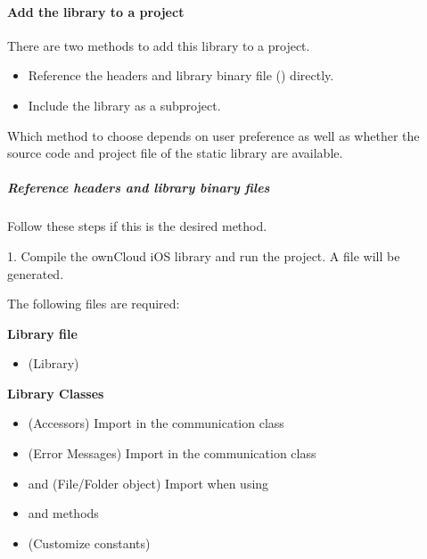 \documentclass[letterpaper,10pt,english]{sphinxmanual}
\begin{document}
\paragraph{Add the library to a project}
\label{ios_library/library_installation:add-the-library-to-a-project}
There are two methods to add this library to a project.
\begin{itemize}
\item {} 
Reference the headers and library binary file () directly.

\item {} 
Include the library as a subproject.

\end{itemize}

Which method to choose depends on user preference as well as whether the source
code and project file of the static library are available.


\subparagraph{Reference headers and library binary files}
\label{ios_library/library_installation:reference-headers-and-library-binary-files}
Follow these steps if this is the desired method.

1. Compile the ownCloud iOS library and run the project.  A 
file will be generated.

The following files are required:

\textbf{Library file}
\begin{itemize}
\item {} 
 (Library)

\end{itemize}

\textbf{Library Classes}
\begin{itemize}
\item {} 
 (Accessors) Import in the communication class

\item {} 
 (Error Messages) Import in the communication class

\item {} 
 and  (File/Folder object) Import when using

\item {} 
 and  methods

\item {} 
 (Customize constants)

\end{itemize}
\end{document}
